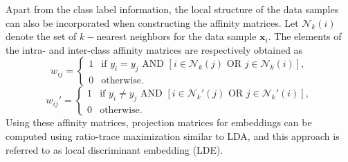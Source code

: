 Apart from the class label information, the local structure of the data samples can also be incorporated when constructing the affinity matrices. Let $\mathcal{N}_k(i)$ denote the set of $k-$nearest neighbors for the data sample $\mathbf{x}_i$. The elements of the intra- and inter-class affinity matrices are respectively obtained as
\begin{equation}
w_{ij} = 
\begin{cases}
1 & \text{if } y_i = y_j \text{ AND } [i \in \mathcal{N}_k(j) \text{ OR } j \in \mathcal{N}_k(i)], \\
0 & \text{otherwise}.
\end{cases}
\label{eqn:ldeintra}
\end{equation}
\begin{equation}
w_{ij}' = 
\begin{cases}
1 & \text{if } y_i \neq y_j \text{ AND } [i \in  \mathcal{N}_k'(j) \text{ OR } j \in \mathcal{N}_k'(i)], \\
0 & \text{otherwise}.
\end{cases}
\label{eqn:ldeinter}
\end{equation}Using these affinity matrices, projection matrices for embeddings can be computed using ratio-trace maximization similar to LDA, and this approach is referred to as local discriminant embedding (LDE).
